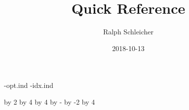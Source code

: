\documentclass[fontsize=8pt,
               toc=flat,
               open=any,
               headings=small]{scrbook}
\title{\PGFPlots{} Quick Reference}
\author{Ralph Schleicher}
\date{2018-10-13}
\begin{document}
\ifgalley
  \raggedbottom
  \raggedright
  \begingroup
    \let\clearpage\relax
    
  \endgroup
\else
  \frontmatter
  
  \begingroup
    \let\clearpage\relax
    
    \thispagestyle{empty}
  \endgroup

  \mainmatter
  \begingroup
    \raggedbottom
    \raggedright
    \begingroup
      \let\clearpage\relax
      
    \endgroup
    \clearpage
    \begingroup
      \let\clearpage\relax
      \def\indexname{Option Index}
      \jobname-opt.ind
      \def\indexname{Concept Index}
      \jobname-idx.ind
    \endgroup
  \endgroup

  \backmatter
  \pagestyle{empty}
  \newcount\extrapages
  \extrapages\value{page}
  \advance\extrapages by 2
  \divide\extrapages by 4
  \multiply\extrapages by 4
  \advance\extrapages by -\value{page}
  \advance\extrapages by -2
  \ifnum{}\else
    \advance\extrapages by 4
  \fi
  \ifnum{}
    \leavevmode\clearpage
  \fi
  \ifnum{}
    \leavevmode\clearpage
    \leavevmode\clearpage
  \fi
  \ifnum{}
    \leavevmode\clearpage
    \leavevmode\clearpage
    \leavevmode\clearpage
  \fi
  
\fi
\end{document}
